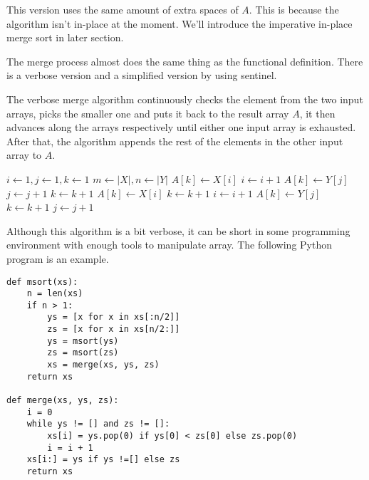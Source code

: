 \documentclass[UTF8]{article}
\begin{document}
This version uses the same amount of extra spaces of $A$. This is because the  algorithm
isn't in-place at the moment. We'll introduce the imperative in-place merge sort in later section.

The merge process almost does the same thing as the functional definition. There is a verbose version
and a simplified version by using sentinel.

The verbose merge algorithm continuously checks the element from the two input arrays, picks the smaller one
and puts it back to the result array $A$, it then advances along the arrays respectively until either
one input array is exhausted. After that, the algorithm appends the rest of the elements in the other
input array to $A$.

\begin{algorithmic}[1]
  \State $i \gets 1, j\gets 1, k\gets 1$
  \State $m \gets |X|, n \gets |Y|$
      \State $A[k] \gets X[i]$
      \State $i \gets i + 1$
    \Else
      \State $A[k] \gets Y[j]$
      \State $j \gets j + 1$
    \EndIf
    \State $k \gets k + 1$
  \EndWhile
    \State $A[k] \gets X[i]$
    \State $k \gets k + 1$
    \State $i \gets i + 1$
  \EndWhile
    \State $A[k] \gets Y[j]$
    \State $k \gets k + 1$
    \State $j \gets j + 1$
  \EndWhile
\EndProcedure
\end{algorithmic}

Although this algorithm is a bit verbose, it can be short in some programming environment with enough tools
to manipulate array. The following Python program is an example.

\lstset{language=Python}
\begin{lstlisting}
def msort(xs):
    n = len(xs)
    if n > 1:
        ys = [x for x in xs[:n/2]]
        zs = [x for x in xs[n/2:]]
        ys = msort(ys)
        zs = msort(zs)
        xs = merge(xs, ys, zs)
    return xs

def merge(xs, ys, zs):
    i = 0
    while ys != [] and zs != []:
        xs[i] = ys.pop(0) if ys[0] < zs[0] else zs.pop(0)
        i = i + 1
    xs[i:] = ys if ys !=[] else zs
    return xs
\end{lstlisting}
\end{document}
